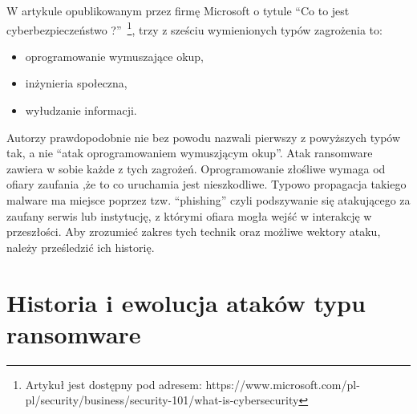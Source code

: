 W artykule opublikowanym przez firmę Microsoft o tytule \enquote{Co to jest cyberbezpieczeństwo ?}~\footnote{Artykuł jest dostępny pod adresem: https://www.microsoft.com/pl-pl/security/business/security-101/what-is-cybersecurity}, trzy z sześciu wymienionych typów zagrożenia to: 
\begin{itemize}
    \item oprogramowanie wymuszające okup,
    \item inżynieria społeczna,
    \item wyłudzanie informacji.
\end{itemize}
Autorzy prawdopodobnie nie bez powodu nazwali pierwszy z powyższych typów tak, a nie 
\enquote{atak oprogramowaniem wymuszjącym okup}. Atak ransomware zawiera w sobie każde z tych zagrożeń.
Oprogramowanie złośliwe wymaga od ofiary zaufania ,że to co uruchamia jest nieszkodliwe. Typowo propagacja takiego malware ma miejsce poprzez tzw. 
\foreignquote{english}{phishing} czyli podszywanie się atakującego za zaufany serwis lub instytucję, z którymi ofiara mogła wejść w interakcję w przeszłości. 
Aby zrozumieć zakres tych technik oraz możliwe wektory ataku, należy prześledzić ich historię.
\section{Historia i ewolucja ataków typu ransomware}
